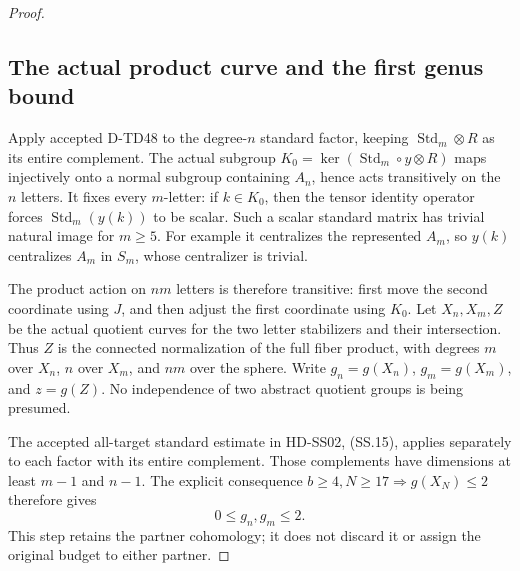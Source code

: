 \begin{proof}
\subsection*{The actual product curve and the first genus bound}

Apply accepted D-TD48 to the degree-\(n\) standard factor, keeping
\(\operatorname{Std}_m\otimes R\) as its entire complement.
The actual subgroup
\(K_0=\ker(\operatorname{Std}_m\circ y\otimes R)\)
maps injectively onto a normal subgroup containing \(A_n\), hence
acts transitively on the \(n\) letters.  It fixes every \(m\)-letter:
if \(k\in K_0\), then the tensor identity operator forces
\(\operatorname{Std}_m(y(k))\) to be scalar.  Such a scalar
standard matrix has trivial natural image for \(m\ge5\).
For example it centralizes the represented \(A_m\), so \(y(k)\)
centralizes \(A_m\) in \(S_m\), whose centralizer is trivial.

The product action on \(n m\) letters is therefore transitive:
first move the second coordinate using \(J\), and then adjust
the first coordinate using \(K_0\).  Let \(X_n,X_m,Z\) be the
actual quotient curves for the two letter stabilizers and their
intersection.  Thus \(Z\) is the connected normalization of the
full fiber product, with degrees \(m\) over \(X_n\), \(n\)
over \(X_m\), and \(nm\) over the sphere.  Write
\(g_n=g(X_n)\), \(g_m=g(X_m)\), and \(z=g(Z)\).
No independence of two abstract quotient groups is being presumed.

The accepted all-target standard estimate in HD-SS02, (SS.15),
applies separately to each factor with its entire complement.
Those complements have dimensions at least \(m-1\) and \(n-1\).
The explicit consequence \(b\ge4,N\ge17\Rightarrow g(X_N)\le2\)
therefore gives
\[
                         0\le g_n,g_m\le2.
 \tag{TPG.3}
\]
This step retains the partner cohomology; it does not discard it
or assign the original budget to either partner.


\end{proof}

